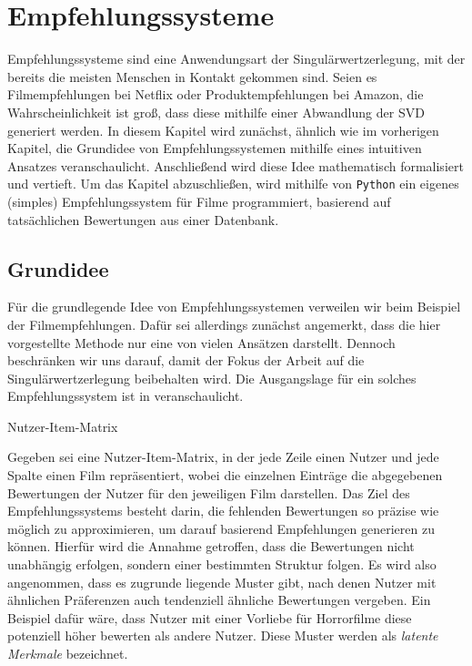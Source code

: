 \chapter{Empfehlungssysteme}\label{chap:rec}

Empfehlungssysteme sind eine Anwendungsart der Singulärwertzerlegung, mit der bereits die meisten Menschen in Kontakt gekommen sind.
Seien es Filmempfehlungen bei Netflix oder Produktempfehlungen bei Amazon, die Wahrscheinlichkeit ist groß, dass diese mithilfe einer Abwandlung der SVD generiert werden.
In diesem Kapitel wird zunächst, ähnlich wie im vorherigen Kapitel, die Grundidee von Empfehlungssystemen mithilfe eines intuitiven Ansatzes veranschaulicht.
Anschließend wird diese Idee mathematisch formalisiert und vertieft.
Um das Kapitel abzuschließen, wird mithilfe von \texttt{Python} ein eigenes (simples) Empfehlungssystem für Filme programmiert, basierend auf tatsächlichen Bewertungen aus einer Datenbank.

\section{Grundidee}

Für die grundlegende Idee von Empfehlungssystemen verweilen wir beim Beispiel der Filmempfehlungen.
Dafür sei allerdings zunächst angemerkt, dass die hier vorgestellte Methode nur eine von vielen Ansätzen darstellt.
Dennoch beschränken wir uns darauf, damit der Fokus der Arbeit auf die Singulärwertzerlegung beibehalten wird. 
Die Ausgangslage für ein solches Empfehlungssystem ist in  veranschaulicht.
\begin{table}[t]
    \centering
    \caption{Nutzer-Item-Matrix}\label{tab:rec:usit}
    
\end{table}

Gegeben sei eine Nutzer-Item-Matrix, in der jede Zeile einen Nutzer und jede Spalte einen Film repräsentiert, wobei die einzelnen Einträge die abgegebenen Bewertungen der Nutzer für den jeweiligen Film darstellen.
Das Ziel des Empfehlungssystems besteht darin, die fehlenden Bewertungen so präzise wie möglich zu approximieren, um darauf basierend Empfehlungen generieren zu können.
Hierfür wird die Annahme getroffen, dass die Bewertungen nicht unabhängig erfolgen, sondern einer bestimmten Struktur folgen.
Es wird also angenommen, dass es zugrunde liegende Muster gibt, nach denen Nutzer mit ähnlichen Präferenzen auch tendenziell ähnliche Bewertungen vergeben.
Ein Beispiel dafür wäre, dass Nutzer mit einer Vorliebe für Horrorfilme diese potenziell höher bewerten als andere Nutzer.
Diese Muster werden als \emph{latente Merkmale} bezeichnet.

